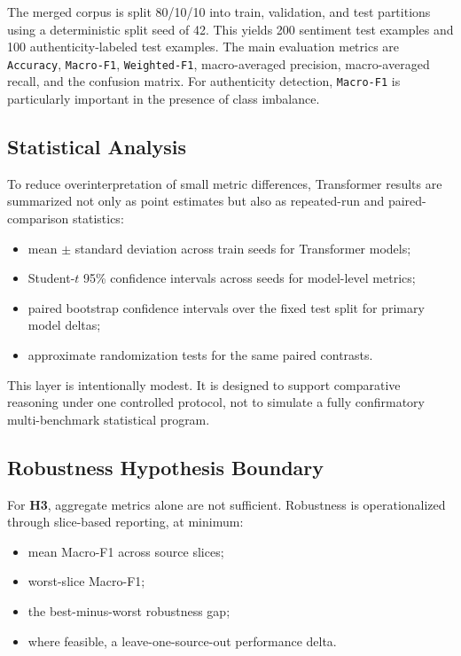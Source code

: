 \documentclass[12pt,a4paper]{article}
\begin{document}
The merged corpus is split 80/10/10 into train, validation, and test partitions using a deterministic split seed of 42. This yields 200 sentiment test examples and 100 authenticity-labeled test examples. The main evaluation metrics are \texttt{Accuracy}, \texttt{Macro-F1}, \texttt{Weighted-F1}, macro-averaged precision, macro-averaged recall, and the confusion matrix. For authenticity detection, \texttt{Macro-F1} is particularly important in the presence of class imbalance.

\subsection{Statistical Analysis}

To reduce overinterpretation of small metric differences, Transformer results are summarized not only as point estimates but also as repeated-run and paired-comparison statistics:

\begin{itemize}[leftmargin=1.5cm]
  \item mean $\pm$ standard deviation across train seeds for Transformer models;
  \item Student-$t$ 95\% confidence intervals across seeds for model-level metrics;
  \item paired bootstrap confidence intervals over the fixed test split for primary model deltas;
  \item approximate randomization tests for the same paired contrasts.
\end{itemize}

This layer is intentionally modest. It is designed to support comparative reasoning under one controlled protocol, not to simulate a fully confirmatory multi-benchmark statistical program.

\subsection{Robustness Hypothesis Boundary}

For \textbf{H3}, aggregate metrics alone are not sufficient. Robustness is operationalized through slice-based reporting, at minimum:

\begin{itemize}[leftmargin=1.5cm]
  \item mean Macro-F1 across source slices;
  \item worst-slice Macro-F1;
  \item the best-minus-worst robustness gap;
  \item where feasible, a leave-one-source-out performance delta.
\end{itemize}
\end{document}
